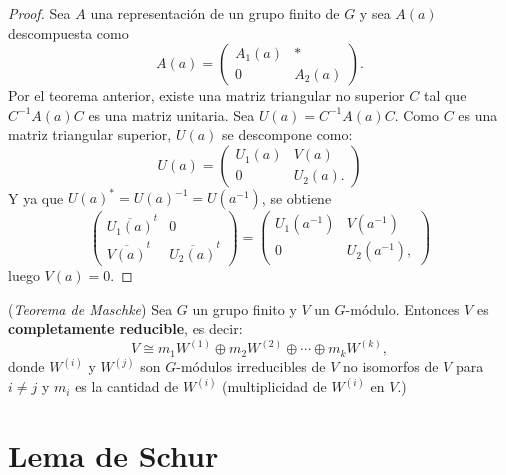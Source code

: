 \documentclass[12pt]{book}
\theoremstyle{definition}
\newcounter{in}
\newcounter{ini}
\begin{document}
\begin{proof}
  Sea $A$ una representación de un grupo finito de $G$ y sea $A(a)$
  descompuesta como
  \begin{equation}
    \label{eq:13}
        A(a)=
    \begin{pmatrix}
      A_{1}(a) & * \\ 
      0 & A_{2}(a)
    \end{pmatrix}.
  \end{equation}
  Por el teorema anterior, existe una matriz triangular no superior
  $C$ tal que $C^{-1}A(a)C$ es una matriz unitaria. Sea
  $U(a)=C^{-1}A(a)C$. Como $C$ es una matriz triangular superior,
  $U(a)$ se descompone como:
  \begin{equation}
    \label{eq:14}
    U(a)=
    \begin{pmatrix}
      U_{1}(a) & V(a) \\ 
      0 & U_{2}(a).
    \end{pmatrix}
  \end{equation}  
  Y ya que $U(a)^{*}=U(a)^{-1}=U(a^{-1})$, se obtiene
  \begin{equation}
    \label{eq:15}
    \begin{pmatrix}
      \overline{U_{1}(a)}^{t} & 0 \\ 
      \overline{V(a)}^{t} & \overline{U_{2}(a)}^{t}
    \end{pmatrix}
    =
    \begin{pmatrix}
      U_{1}(a^{-1}) & V(a^{-1}) \\ 
      0 & U_{2}(a^{-1}),
    \end{pmatrix}
  \end{equation}
  luego $V(a)=0$.
\end{proof}

\begin{mdframed}
  (\textit{Teorema de Maschke}) Sea $G$ un grupo finito y $V$ un
  $G$-módulo. Entonces $V$ es \textbf{completamente reducible}, es
  decir:
  \begin{equation}
    \label{eq:95}
    V \cong m_1W^{(1)} \oplus m_2W^{(2)} \oplus  \cdots \oplus m_kW^{(k)}, 
  \end{equation}
  donde $W^{(i)}$ y $W^{(j)}$ son $G$-módulos irreducibles de $V$ no
  isomorfos de $V$ para $i \neq j$ y $m_i$ es la cantidad de $W^{(i)}$
  (multiplicidad de $W^{(i)}$ en $V$.)
\end{mdframed}
\section{Lema de Schur}
\label{sec:schur}
\end{document}
